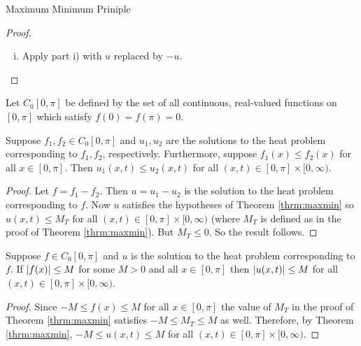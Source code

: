 \begin{section}{Maximum Minimum Priniple}
\begin{proof}
\begin{enumerate}[i)]
			By Lemma \ref{lemma:maxmin} $v(x,t) \leq M_T$ when
			$a \leq x \leq b$ and $0 \leq t \leq T$. So
				\begin{displaymath}
					u(x,t) + \epsilon x^2 \leq M_T
				\end{displaymath}
			on this same region. Since this is true for all
			$\epsilon > 0$ and $T > 0$, the result follows.
		
		\item
			Apply part i) with $u$ replaced by $-u$.
	\end{enumerate}
\end{proof}		


\begin{defn}
	Let $C_0[0,\pi]$ be defined by the set of all
	continuous, real-valued functions on $[0,\pi]$
	which satisfy $f(0) = f(\pi) = 0$.
\end{defn}

\begin{cor}
	Suppose $f_1, f_2 \in C_0[0,\pi]$ and $u_1, u_2$
	are the solutions to the heat problem corresponding
	to $f_1, f_2$, respectively. Furthermore, suppose
	$f_1(x) \leq f_2(x)$ for all $x \in [0,\pi]$. Then
	$u_1(x,t) \leq u_2(x,t)$ for all $(x,t) \in [0,\pi]
	\times [0,\infty)$.
\end{cor}

\begin{proof}
	Let $f = f_1 - f_2$. Then $u = u_1 - u_2$ is the
	solution to the heat problem corresponding to $f$.
	Now $u$ satisfies the hypotheses of Theorem
	\ref{thrm:maxmin} so $u(x,t) \leq M_T$ for all
	$(x,t) \in [0,\pi] \times [0,\infty)$ (where $M_T$
	is defined as in the proof of Theorem \ref{thrm:maxmin}).
	But $M_T \leq 0$. So the result follows.
\end{proof}

\begin{cor}\label{cor:maxmin2}
	Suppose $f \in C_0[0,\pi]$ and $u$ is the solution to
	the heat problem corresponding to $f$. If $\left \vert {
	f(x)} \right \vert \leq M$ for some $M > 0$ and all $x \in [0,\pi]$
	then $\left \vert {u(x,t)} \right \vert \leq M$ for all $(x,t) \in [0,\pi]
	\times [0,\infty)$.
\end{cor}

\begin{proof}
	Since $-M \leq f(x) \leq M$ for all $x \in [0,\pi]$ the
	value of $M_T$ in the proof of Theorem \ref{thrm:maxmin}
	satisfies $-M \leq M_T \leq M$ as well. Therefore, by
	Theorem \ref{thrm:maxmin}, $-M \leq u(x,t) \leq M$ for
	all $(x,t) \in [0,\pi] \times [0,\infty)$.
\end{proof}


\end{section}

